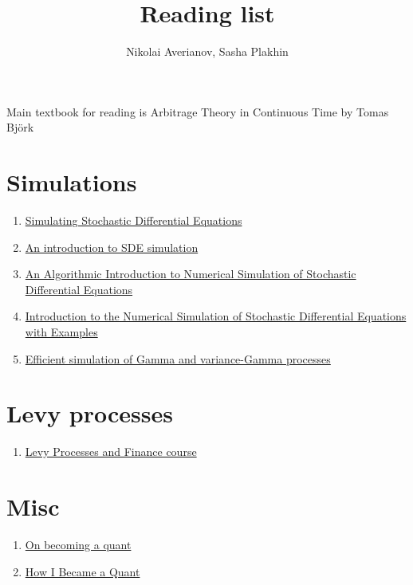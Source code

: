 \documentclass[a4paper, 12pt]{article}
\author{Nikolai Averianov, Sasha Plakhin}
\title{Reading list}
\begin{document}
\maketitle

Main textbook for reading is 
Arbitrage Theory in Continuous Time by Tomas Björk
\section*{Simulations}
\begin{enumerate}
	\item \href{http://www.columbia.edu/~mh2078/MonteCarlo/MCS_SDEs.pdf}{Simulating Stochastic Differential Equations}
	
	\item \href{https://arxiv.org/pdf/1004.0646.pdf}{An introduction to SDE simulation}
	
	\item \href{https://epubs.siam.org/doi/pdf/10.1137/S0036144500378302}{An Algorithmic Introduction to Numerical Simulation of Stochastic Differential Equations}
	
	\item \href{http://www.cs.fsu.edu/~mascagni/Petersen_SDE.pdf}{Introduction to the Numerical Simulation of Stochastic Differential Equations with Examples}
	
	\item \href{https://www.researchgate.net/publication/4053873_Efficient_simulation_of_Gamma_and_variance-Gamma_processes}{Efficient simulation of Gamma and variance-Gamma processes}
\end{enumerate}

\section*{Levy processes}
\begin{enumerate}
	\item \href{https://www.stats.ox.ac.uk/~winkel/ms3b10.pdf}{Levy Processes and Finance course}
\end{enumerate}

\section*{Misc}
\begin{enumerate}
	
	\item \href{https://www.maths.usyd.edu.au/u/UG/SM/MATH3075/r/Joshi_2008.pdf}{On becoming a quant}
	\item \href{https://engineering.nyu.edu/sites/default/files/2021-10/How_I_Became_a_Quant\%20\%281\%29.pdf}{How I Became a Quant}
\end{enumerate}
\end{document}
